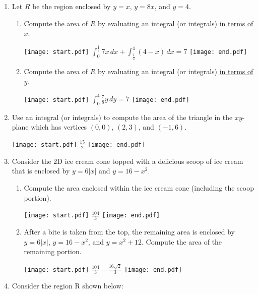 \documentclass[12pt]{article}
\begin{document}
\begin{enumerate}
\item Let $R$ be the region enclosed by $y=x$, $y=8x$, and $y=4$.  

\begin{enumerate}

\item Compute the area of $R$ by evaluating an integral (or integrals) \underline{in terms of $x$}.

\texttt{[image: start.pdf]}
{{$\int_{0}^{\frac{1}{2}} 7x \,dx + \int_{\frac{1}{2}}^4 (4-x) \,dx= 7$}}
\texttt{[image: end.pdf]}


\item Compute the area of $R$ by evaluating an integral (or integrals) \underline{in terms of $y$}.

\texttt{[image: start.pdf]}
{{$\int_0^4 \frac{7}{8}y \,dy=7$}}
\texttt{[image: end.pdf]}


\end{enumerate}

\item Use an integral (or integrals) to compute the area of the triangle in the $xy$-plane which has vertices $(0,0)$, $(2,3)$, and $(-1,6)$.

\texttt{[image: start.pdf]}
{{$\frac{15}{2}$}}
\texttt{[image: end.pdf]}


\item Consider the 2D ice cream cone topped with a delicious scoop of ice cream that is enclosed by $y=6|x|$ and $y=16-x^2$.

\begin{enumerate}

\item Compute the area enclosed within the ice cream cone (including the scoop portion).

\texttt{[image: start.pdf]}
{{$\frac{104}{3}$}}
\texttt{[image: end.pdf]}


\item After a bite is taken from the top, the remaining area is enclosed by $y=6|x|$, $y=16-x^2$, and $y=x^2+12$.  Compute the area of the remaining portion.

\texttt{[image: start.pdf]}
{{$\frac{104}{3}-\frac{16\sqrt{2}}{3}$}}
\texttt{[image: end.pdf]}


\end{enumerate}

\item Consider the region R shown below:

\begin{center}


\end{center}
\end{enumerate}
\end{document}
